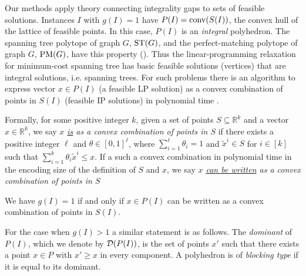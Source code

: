 Our methods apply theory connecting integrality gaps to sets of feasible solutions. Instances $I$ with $g(I)=1$ have $P(I)=\operatorname{conv}(S(I))$, the convex hull of the lattice of feasible points. In this case, $P(I)$ is an \textit{integral} polyhedron. The spanning tree polytope of graph $G$, $\operatorname{ST}(G)$, and the perfect-matching polytope of graph $G$, $\operatorname{{{PM}}}(G)$, have this property (\cite{Edmonds2003,edmondsPM}). Thus the linear-programming relaxation for minimum-cost spanning tree has basic feasible solutions (vertices) that are integral solutions, i.e. spanning trees. For such problems there is an algorithm to express vector $x\in P(I)$ (a feasible LP solution) as a convex combination of points in $S(I)$ (feasible IP solutions) in polynomial time \cite{cons-cara}.


Formally, for some positive integer $k$, given a set of points $S\subseteq \mathbb{R}^k$ and a vector $x\in \mathbb{R}^k$, we say \textit{$x$ \underline{is} as a convex combination of points in $S$} if there exists a positive integer $\ell$ and $\theta \in [0,1]^\ell$, where $\sum_{i=1}^{\ell}\theta_i =1$ and $\tilde{x}^i\in S$ for $i\in [k]$ such that $\sum_{i=1}^{k}\theta_i \tilde{x}^i\leq x$. If a such a convex combination in polynomial time in the encoding size of the definition of $S$ and $x$, we say  \textit{$x$ \underline{can be written} as a convex combination of points in $S$}

\begin{proposition}\label{cara}
	We have $g(I)=1$ if and only if $x\in P(I)$ can be written as a convex combination of points in $S(I)$.
\end{proposition}

For the case when $g(I)>1$ a similar statement is as follows. The {\em dominant} of $P(I)$, which we denote by $\operatorname{\mathcal{D}}(P(I))$, is the set of points $x'$ such that there exists a point $x\in P$ with $x'\geq x$ in every component. A polyhedron is of \textit{blocking type} if it is equal to its dominant.

